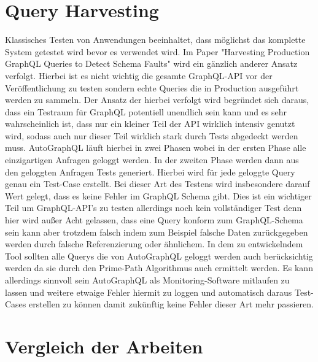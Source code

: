 \section{Query Harvesting}

Klassisches Testen von Anwendungen beeinhaltet, dass möglichst das komplette System getestet wird bevor es verwendet wird.
Im Paper "Harvesting Production GraphQL Queries to Detect Schema Faults" wird ein gänzlich anderer Ansatz verfolgt.
Hierbei ist es nicht wichtig die gesamte GraphQL-API vor der Veröffentlichung zu testen sondern
echte Queries die in Production ausgeführt werden zu sammeln.
Der Ansatz der hierbei verfolgt wird begründet sich daraus,
dass ein Testraum für GraphQL potentiell unendlich sein kann und es sehr wahrscheinlich ist, dass nur ein kleiner
Teil der API wirklich intensiv genutzt wird, sodass auch nur dieser Teil wirklich stark durch Tests abgedeckt werden muss.
AutoGraphQL läuft hierbei in zwei Phasen wobei in der ersten Phase alle einzigartigen Anfragen geloggt werden.
In der zweiten Phase werden dann aus den geloggten Anfragen Tests generiert.
Hierbei wird für jede geloggte Query genau ein Test-Case erstellt.
Bei dieser Art des Testens wird insbesondere darauf Wert gelegt, dass es keine Fehler im GraphQL Schema gibt.
Dies ist ein wichtiger Teil um GraphQL-API's zu testen allerdings noch kein vollständiger Test denn hier wird außer Acht gelassen,
dass eine Query konform zum GraphQL-Schema sein kann aber trotzdem falsch indem zum Beispiel falsche Daten zurückgegeben werden
durch falsche Referenzierung oder ähnlichem.
In dem zu entwickelndem Tool sollten alle Querys die von AutoGraphQL geloggt werden auch berücksichtig werden da sie durch
den Prime-Path Algorithmus auch ermittelt werden.
Es kann allerdings sinnvoll sein AutoGraphQL als Monitoring-Software mitlaufen zu lassen und weitere etwaige Fehler hiermit zu loggen
und automatisch daraus Test-Cases erstellen zu können damit zukünftig keine Fehler dieser Art mehr passieren.

\section{Vergleich der Arbeiten}

